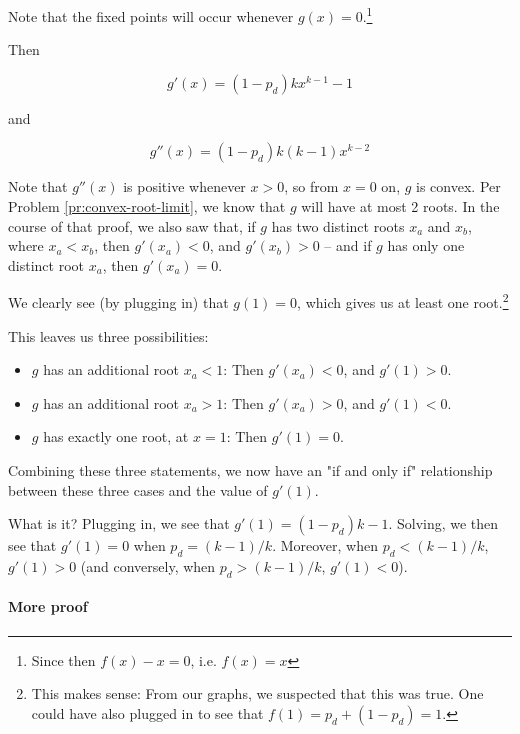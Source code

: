 Note that the fixed points will occur whenever $g(x) = 0$.\footnote{Since then $f(x) - x = 0$, i.e. $f(x) = x$}

Then

\begin{equation}
g'(x) = (1 - p_d)kx^{k-1} - 1
\end{equation}

and

\begin{equation}
g''(x) = (1 - p_d)k(k-1)x^{k-2}
\end{equation}

Note that $g''(x)$ is positive whenever $x > 0$, so from $x = 0$ on, $g$ is convex. Per Problem \ref{pr:convex-root-limit}, we know that $g$ will have at most 2 roots. In the course of that proof, we also saw that, if $g$ has two distinct roots $x_a$ and $x_b$, where $x_a < x_b$, then $g'(x_a) < 0$, and $g'(x_b) > 0$ -- and if $g$ has only one distinct root $x_a$, then $g'(x_a) = 0$. %

We clearly see (by plugging in) that $g(1) = 0$, which gives us at least one root.\footnote{This makes sense: From our graphs, we suspected that this was true. One could have also plugged in to see that $f(1) = p_d + (1 - p_d) = 1$.}

This leaves us three possibilities:

\begin{itemize}
\item $g$ has an additional root $x_a < 1$: Then $g'(x_a) < 0$, and $g'(1) > 0$.
\item $g$ has an additional root $x_a > 1$: Then $g'(x_a) > 0$, and $g'(1) < 0$.
\item $g$ has exactly one root, at $x = 1$: Then $g'(1) = 0$.
\end{itemize}


Combining these three statements, we now have an "if and only if" relationship between these three cases and the value of $g'(1)$. 

What is it? Plugging in, we see that $g'(1) = (1 - p_d)k - 1$. Solving, we then see that $g'(1) = 0$ when $p_d = (k-1)/k$. Moreover, when $p_d < (k-1)/k$, $g'(1) > 0$ (and conversely, when $p_d > (k-1)/k$, $g'(1) < 0$). 

\paragraph{More proof}

